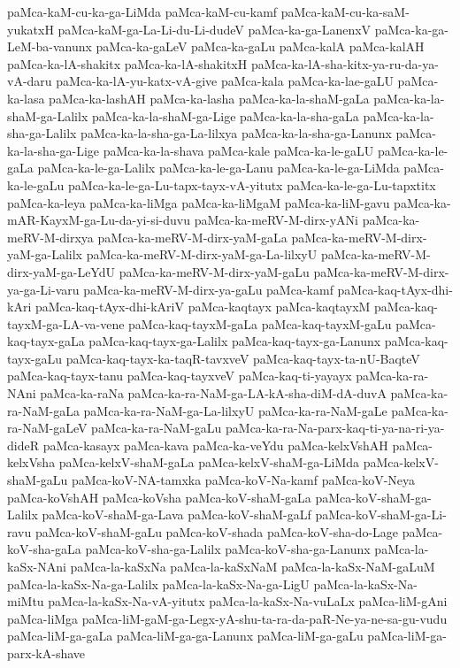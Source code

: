 {paMca-kaM-cu-ka-ga-LiMda
paMca-kaM-cu-kamf
paMca-kaM-cu-ka-saM-yukatxH
paMca-kaM-ga-La-Li-du-Li-dudeV
paMca-ka-ga-LanenxV
paMca-ka-ga-LeM-ba-vanunx
paMca-ka-gaLeV
paMca-ka-gaLu
paMca-kalA
paMca-kalAH
paMca-ka-lA-shakitx
paMca-ka-lA-shakitxH
paMca-ka-lA-sha-kitx-ya-ru-da-ya-vA-daru
paMca-ka-lA-yu-katx-vA-give
paMca-kala
paMca-ka-lae-gaLU
paMca-ka-lasa
paMca-ka-lashAH
paMca-ka-lasha
paMca-ka-la-shaM-gaLa
paMca-ka-la-shaM-ga-Lalilx
paMca-ka-la-shaM-ga-Lige
paMca-ka-la-sha-gaLa
paMca-ka-la-sha-ga-Lalilx
paMca-ka-la-sha-ga-La-lilxya
paMca-ka-la-sha-ga-Lanunx
paMca-ka-la-sha-ga-Lige
paMca-ka-la-shava
paMca-kale
paMca-ka-le-gaLU
paMca-ka-le-gaLa
paMca-ka-le-ga-Lalilx
paMca-ka-le-ga-Lanu
paMca-ka-le-ga-LiMda
paMca-ka-le-gaLu
paMca-ka-le-ga-Lu-tapx-tayx-vA-yitutx
paMca-ka-le-ga-Lu-tapxtitx
paMca-ka-leya
paMca-ka-liMga
paMca-ka-liMgaM
paMca-ka-liM-gavu
paMca-ka-mAR-KayxM-ga-Lu-da-yi-si-duvu
paMca-ka-meRV-M-dirx-yANi
paMca-ka-meRV-M-dirxya
paMca-ka-meRV-M-dirx-yaM-gaLa
paMca-ka-meRV-M-dirx-yaM-ga-Lalilx
paMca-ka-meRV-M-dirx-yaM-ga-La-lilxyU
paMca-ka-meRV-M-dirx-yaM-ga-LeYdU
paMca-ka-meRV-M-dirx-yaM-gaLu
paMca-ka-meRV-M-dirx-ya-ga-Li-varu
paMca-ka-meRV-M-dirx-ya-gaLu
paMca-kamf
paMca-kaq-tAyx-dhi-kAri
paMca-kaq-tAyx-dhi-kAriV
paMca-kaqtayx
paMca-kaqtayxM
paMca-kaq-tayxM-ga-LA-va-vene
paMca-kaq-tayxM-gaLa
paMca-kaq-tayxM-gaLu
paMca-kaq-tayx-gaLa
paMca-kaq-tayx-ga-Lalilx
paMca-kaq-tayx-ga-Lanunx
paMca-kaq-tayx-gaLu
paMca-kaq-tayx-ka-taqR-tavxveV
paMca-kaq-tayx-ta-nU-BaqteV
paMca-kaq-tayx-tanu
paMca-kaq-tayxveV
paMca-kaq-ti-yayayx
paMca-ka-ra-NAni
paMca-ka-raNa
paMca-ka-ra-NaM-ga-LA-kA-sha-diM-dA-duvA
paMca-ka-ra-NaM-gaLa
paMca-ka-ra-NaM-ga-La-lilxyU
paMca-ka-ra-NaM-gaLe
paMca-ka-ra-NaM-gaLeV
paMca-ka-ra-NaM-gaLu
paMca-ka-ra-Na-parx-kaq-ti-ya-na-ri-ya-dideR
paMca-kasayx
paMca-kava
paMca-ka-veYdu
paMca-kelxVshAH
paMca-kelxVsha
paMca-kelxV-shaM-gaLa
paMca-kelxV-shaM-ga-LiMda
paMca-kelxV-shaM-gaLu
paMca-koV-NA-tamxka
paMca-koV-Na-kamf
paMca-koV-Neya
paMca-koVshAH
paMca-koVsha
paMca-koV-shaM-gaLa
paMca-koV-shaM-ga-Lalilx
paMca-koV-shaM-ga-Lava
paMca-koV-shaM-gaLf
paMca-koV-shaM-ga-Li-ravu
paMca-koV-shaM-gaLu
paMca-koV-shada
paMca-koV-sha-do-Lage
paMca-koV-sha-gaLa
paMca-koV-sha-ga-Lalilx
paMca-koV-sha-ga-Lanunx
paMca-la-kaSx-NAni
paMca-la-kaSxNa
paMca-la-kaSxNaM
paMca-la-kaSx-NaM-gaLuM
paMca-la-kaSx-Na-ga-Lalilx
paMca-la-kaSx-Na-ga-LigU
paMca-la-kaSx-Na-miMtu
paMca-la-kaSx-Na-vA-yitutx
paMca-la-kaSx-Na-vuLaLx
paMca-liM-gAni
paMca-liMga
paMca-liM-gaM-ga-Legx-yA-shu-ta-ra-da-paR-Ne-ya-ne-sa-gu-vudu
paMca-liM-ga-gaLa
paMca-liM-ga-ga-Lanunx
paMca-liM-ga-gaLu
paMca-liM-ga-parx-kA-shave
}
